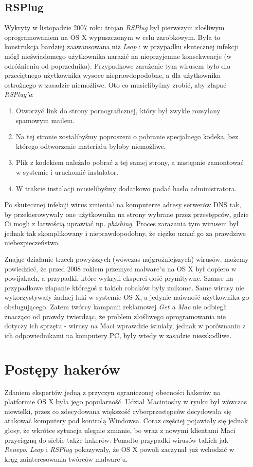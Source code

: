 \documentclass[polish]{kbk}
\begin{document}
\subsection{RSPlug \cite{rsplug}}
Wykryty w listopadzie 2007 roku trojan \textit{RSPlug} był pierwszym złośliwym oprogramowaniem na OS X wypuszczonym w celu zarobkowym. Była to konstrukcja bardziej zaawansowana niż \textit{Leap} i w przypadku skutecznej infekcji mógł nieświadomego użytkownika narazić na nieprzyjemne konsekwencje (w odróżnieniu od poprzednika). Przypadkowe zarażenie tym wirusem było dla przeciętnego użytkownika wysoce nieprawdopodobne, a  dla użytkownika ostrożnego w zasadzie niemożliwe. Oto co musielibyśmy zrobić, aby złapać \textit{RSPlug'a}:
\begin{enumerate}
\item Otworzyć link do strony pornograficznej, który był zwykle rozsyłany spamowym mailem.
\item Na tej stronie zostalibyśmy poproszeni o pobranie specjalnego kodeka, bez którego odtworzenie materiału byłoby niemożliwe.
\item Plik z kodekiem należało pobrać z tej samej strony, a następnie zamontować w systemie i uruchomić instalator.
\item W trakcie instalacji musielibyśmy dodatkowo podać hasło administratora.
\end{enumerate}
Po skutecznej infekcji wirus zmieniał na komputerze adresy serwerów DNS tak, by przekierowywały one użytkownika na strony wybrane przez przestępców, gdzie Ci mogli z łatwością uprawiać np. \textit{phishing}. Proces zarażania tym wirusem był jednak tak skomplikowany i nieprawdopodobny, że ciężko uznać go za prawdziwe niebezpieczeństwo.

Znając działanie trzech powyższych (wówczas najgroźniejszych) wirusów, możemy powiedzieć, że przed 2008 rokiem przemysł malware'u na OS X był dopiero w powijakach, a przypadki, które wykryli eksperci dość prymitywne. Szanse na przypadkowe złapanie któregoś z takich robaków były znikome. Same wirusy nie wykorzystywały żadnej luki w systemie OS X, a jedynie naiwność użytkownika go obsługującego. Zatem twórcy kampanii reklamowej \textit{Get a Mac} nie odbiegli znacząco od prawdy twierdząc, że problem złośliwego oprogramowania nie dotyczy ich sprzętu - wirusy na Maci wprawdzie istniały, jednak w porównaniu z ich odpowiednikami na komputery PC, były wtedy w zasadzie nieszkodliwe.

\section{Postępy hakerów}
Zdaniem ekspertów jedną z przyczyn ograniczonej obecności hakerów na platformie OS X była jego popularność. Udział Macintoshy w rynku był wówczas niewielki, przez co zdecydowana większość cyberprzestępców decydowała się atakować komputery pod kontrolą Windowsa. Coraz częściej pojawiały się jednak głosy, że wkrótce sytuacja ulegnie zmianie, bo wraz z nowymi klientami Maci przyciągną do siebie także hakerów. Ponadto przypadki wirusów takich jak \textit{Renepo}, \textit{Leap} i \textit{RSPlug} pokazywały, że OS X powoli zaczynał już wchodzić w krąg zainteresowania twórców malware'u.
\end{document}
